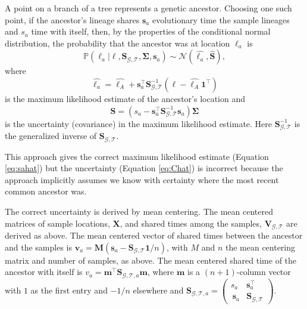 \documentclass[12pt]{article}
\begin{document}
A point on a branch of a tree represents a genetic ancestor.
Choosing one such point, if the ancestor's lineage shares $\mathbf{s}_a$ evolutionary time the sample lineages and $s_a$ time with itself, then, by the properties of the conditional normal distribution, the probability that the ancestor was at location $\bm{\ell}_a$ is
%
\begin{equation}\label{eq:Psa}
\mathbb{P}(\bm{\ell}_a | \bm{\ell}, \mathbf{S}_{\mathcal{G},\mathcal{T}}, \mathbf{\Sigma}, \mathbf{s}_a) \sim \mathcal{N}\left(\widehat{\bm{\ell}_a}, \widehat{\mathbf{S}} \right),
\end{equation}
%
where
%
\begin{equation}\label{eq:sahat}
\widehat{\bm{\ell}_a} = \widehat{\bm{\ell}_A} + \mathbf{s}_a^\intercal \mathbf{S}_{\mathcal{G},\mathcal{T}}^{-1} (\bm{\ell} - \widehat{\bm{\ell}_A}\mathbf{1}^\intercal)
\end{equation}
%
is the maximum likelihood estimate of the ancestor's location and
%
\begin{equation}\label{eq:Chat}
\widehat{\mathbf{S}} = (s_a - \mathbf{s}_a^\intercal \mathbf{S}_{\mathcal{G},\mathcal{T}}^{-1} \mathbf{s}_a)\mathbf{\Sigma}
\end{equation}
%
is the uncertainty (covariance) in the maximum likelihood estimate.
Here $\mathbf{S}_{\mathcal{G},\mathcal{T}}^{-1}$ is the generalized inverse of $\mathbf{S}_{\mathcal{G},\mathcal{T}}$.

This approach gives the correct maximum likelihood estimate (Equation \eqref{eq:sahat}) but the uncertainty (Equation \eqref{eq:Chat}) is incorrect because the approach implicitly assumes we know with certainty where the most recent common ancestor was.

The correct uncertainty is derived by mean centering.
The mean centered matrices of sample locations, $\mathbf{X}$, and shared times among the samples, $\mathbf{V}_{\mathcal{G},\mathcal{T}}$ are derived as above.
The mean centered vector of shared times between the ancestor and the samples is $\mathbf{v}_a = \mathbf{M}(\mathbf{s}_a - \mathbf{S}_{\mathcal{G},\mathcal{T}}\mathbf{1}/n)$, with $M$ and $n$ the mean centering matrix and number of samples, as above.
The mean centered shared time of the ancestor with itself is $v_a = \mathbf{m}^\intercal \mathbf{S}_{\mathcal{G},\mathcal{T},a} \mathbf{m}$, where $\mathbf{m}$ is a $(n+1)$-column vector with $1$ as the first entry and $-1/n$ elsewhere and $\mathbf{S}_{\mathcal{G},\mathcal{T},a} = \begin{pmatrix} s_a & \mathbf{s}_a^\intercal \\\ \mathbf{s}_a & \mathbf{S}_{\mathcal{G},\mathcal{T}} \end{pmatrix}$.
\end{document}
